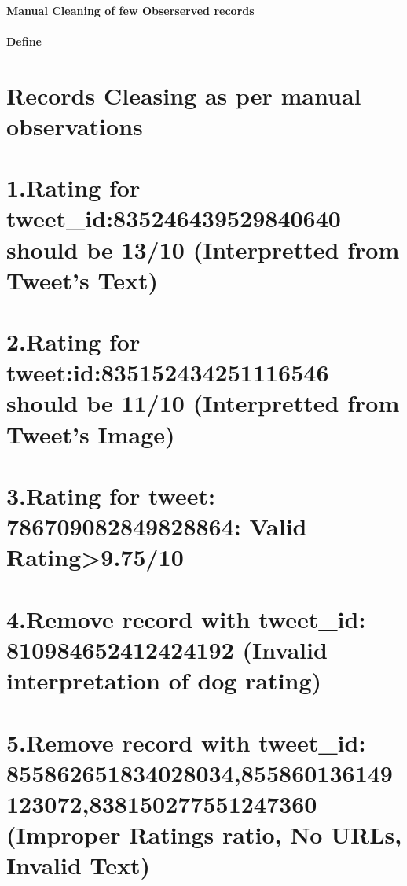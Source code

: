 \documentclass[11pt]{article}
\begin{document}
    \paragraph{Manual Cleaning of few Obserserved
records}\label{manual-cleaning-of-few-obserserved-records}

    \paragraph{Define}\label{define}

\section{Records Cleasing as per manual
observations}\label{records-cleasing-as-per-manual-observations}

\section{1.Rating for tweet\_id:835246439529840640 should be 13/10
(Interpretted from Tweet's
Text)}\label{rating-for-tweet_id835246439529840640-should-be-1310-interpretted-from-tweets-text}

\section{2.Rating for tweet:id:835152434251116546 should be 11/10
(Interpretted from Tweet's
Image)}\label{rating-for-tweetid835152434251116546-should-be-1110-interpretted-from-tweets-image}

\section{3.Rating for tweet: 786709082849828864: Valid
Rating\textgreater{}9.75/10}\label{rating-for-tweet-786709082849828864-valid-rating9.7510}

\section{4.Remove record with tweet\_id: 810984652412424192 (Invalid
interpretation of dog
rating)}\label{remove-record-with-tweet_id-810984652412424192-invalid-interpretation-of-dog-rating}

\section{5.Remove record with tweet\_id:
855862651834028034,855860136149123072,838150277551247360 (Improper
Ratings ratio, No URLs, Invalid
Text)}\label{remove-record-with-tweet_id-855862651834028034855860136149123072838150277551247360-improper-ratings-ratio-no-urls-invalid-text}
\end{document}
